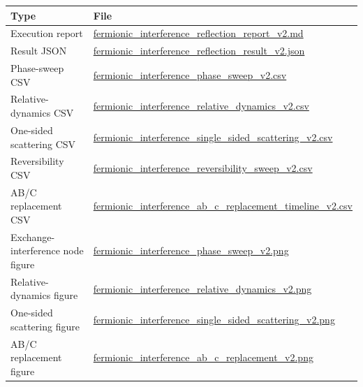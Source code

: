 \documentclass[
  a4paper,
]{article}
\newcounter{none} %
\begin{document}
{\def\LTcaptype{none} %
\begin{longtable}[]{@{}
  >{\raggedright\arraybackslash}p{}
  >{\raggedright\arraybackslash}p{}@{}}
\toprule\noalign{}
\begin{minipage}[b]{\linewidth}\raggedright
Type
\end{minipage} & \begin{minipage}[b]{\linewidth}\raggedright
File
\end{minipage} \\
\midrule\noalign{}
\endhead
\bottomrule\noalign{}
\endlastfoot
Execution report &
\href{fermionic_interference_reflection_result_v2/fermionic_interference_reflection_report_v2.md}{fermionic\_interference\_reflection\_report\_v2.md} \\
Result JSON &
\href{fermionic_interference_reflection_result_v2/fermionic_interference_reflection_result_v2.json}{fermionic\_interference\_reflection\_result\_v2.json} \\
Phase-sweep CSV &
\href{fermionic_interference_reflection_result_v2/fermionic_interference_phase_sweep_v2.csv}{fermionic\_interference\_phase\_sweep\_v2.csv} \\
Relative-dynamics CSV &
\href{fermionic_interference_reflection_result_v2/fermionic_interference_relative_dynamics_v2.csv}{fermionic\_interference\_relative\_dynamics\_v2.csv} \\
One-sided scattering CSV &
\href{fermionic_interference_reflection_result_v2/fermionic_interference_single_sided_scattering_v2.csv}{fermionic\_interference\_single\_sided\_scattering\_v2.csv} \\
Reversibility CSV &
\href{fermionic_interference_reflection_result_v2/fermionic_interference_reversibility_sweep_v2.csv}{fermionic\_interference\_reversibility\_sweep\_v2.csv} \\
AB/C replacement CSV &
\href{fermionic_interference_reflection_result_v2/fermionic_interference_ab_c_replacement_timeline_v2.csv}{fermionic\_interference\_ab\_c\_replacement\_timeline\_v2.csv} \\
Exchange-interference node figure &
\href{fermionic_interference_reflection_result_v2/fermionic_interference_phase_sweep_v2.png}{fermionic\_interference\_phase\_sweep\_v2.png} \\
Relative-dynamics figure &
\href{fermionic_interference_reflection_result_v2/fermionic_interference_relative_dynamics_v2.png}{fermionic\_interference\_relative\_dynamics\_v2.png} \\
One-sided scattering figure &
\href{fermionic_interference_reflection_result_v2/fermionic_interference_single_sided_scattering_v2.png}{fermionic\_interference\_single\_sided\_scattering\_v2.png} \\
AB/C replacement figure &
\href{fermionic_interference_reflection_result_v2/fermionic_interference_ab_c_replacement_v2.png}{fermionic\_interference\_ab\_c\_replacement\_v2.png} \\
\end{longtable}
}
\end{document}
